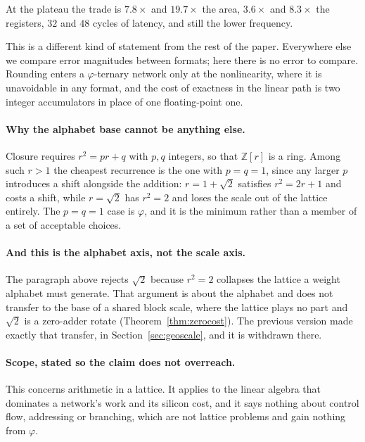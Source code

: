 \documentclass[11pt]{article}
\theoremstyle{definition}
\begin{document}
At the plateau the trade is $7.8\times$ and $19.7\times$ the area,
$3.6\times$ and $8.3\times$ the registers, $32$ and $48$ cycles of latency, and
still the lower frequency.


This is a different kind of statement from the rest of the paper. Everywhere else
we compare error magnitudes between formats; here there is no error to compare.
Rounding enters a $\varphi$-ternary network only at the nonlinearity, where it is
unavoidable in any format, and the cost of exactness in the linear path is two
integer accumulators in place of one floating-point one.

\paragraph{Why the alphabet base cannot be anything else.} Closure requires
$r^{2} = pr + q$ with $p,q$ integers, so that $\mathbb{Z}[r]$ is a ring. Among
such $r>1$ the cheapest recurrence is the one with $p=q=1$, since any larger $p$
introduces a shift alongside the addition: $r = 1+\sqrt2$ satisfies
$r^2 = 2r+1$ and costs a shift, while $r=\sqrt2$ has $r^2 = 2$ and loses the
scale out of the lattice entirely. The $p=q=1$ case is $\varphi$, and it is the
minimum rather than a member of a set of acceptable choices.

\paragraph{And this is the alphabet axis, not the scale axis.} The paragraph
above rejects $\sqrt2$ because $r^{2}=2$ collapses the lattice a weight alphabet
must generate. That argument is about the alphabet and does not transfer to the
base of a shared block scale, where the lattice plays no part and $\sqrt2$ is a
zero-adder rotate (Theorem~\ref{thm:zerocost}). The previous version made exactly
that transfer, in Section~\ref{sec:geoscale}, and it is withdrawn there.

\paragraph{Scope, stated so the claim does not overreach.} This concerns
arithmetic in a lattice. It applies to the linear algebra that dominates a
network's work and its silicon cost, and it says nothing about control flow,
addressing or branching, which are not lattice problems and gain nothing from
$\varphi$.


\end{document}
